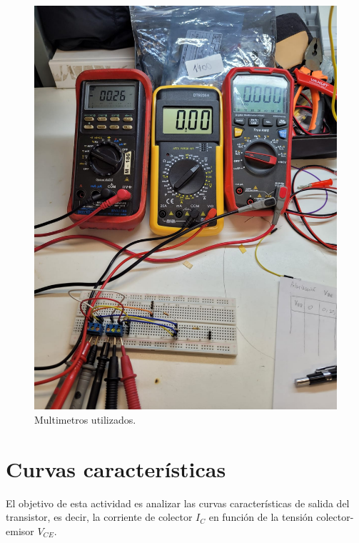 \documentclass[chaptersright]{informeutn}
\begin{document}
\begin{figure}[H]
\begin{minipage}{0.40\textwidth}
          \includegraphics[width=\textwidth]{pictures/multimetros-juntura-be.jpeg}
          \caption{Multimetros utilizados.}
          \label{fig:multimetros}
        \end{minipage}
        \end{figure}
        
\chapter{Curvas características}
El objetivo de esta actividad es analizar las curvas características de
salida del transistor, es decir, la corriente de colector $I_C$ en función
de la tensión colector-emisor $V_{CE}$.
\end{document}
